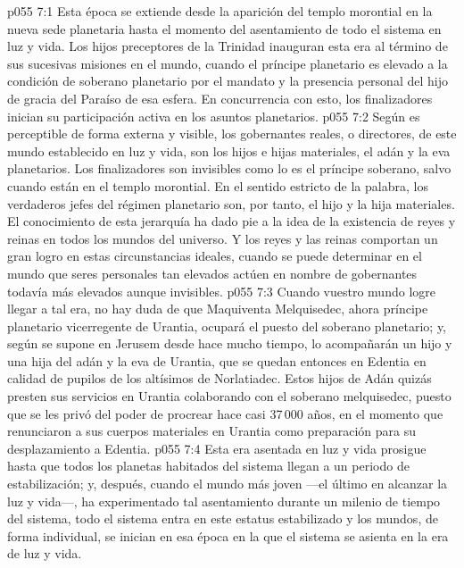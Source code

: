 \vs p055 7:1 Esta época se extiende desde la aparición del templo morontial en la nueva sede planetaria hasta el momento del asentamiento de todo el sistema en luz y vida. Los hijos preceptores de la Trinidad inauguran esta era al término de sus sucesivas misiones en el mundo, cuando el príncipe planetario es elevado a la condición de soberano planetario por el mandato y la presencia personal del hijo de gracia del Paraíso de esa esfera. En concurrencia con esto, los finalizadores inician su participación activa en los asuntos planetarios.
\vs p055 7:2 Según es perceptible de forma externa y visible, los gobernantes reales, o directores, de este mundo establecido en luz y vida, son los hijos e hijas materiales, el adán y la eva planetarios. Los finalizadores son invisibles como lo es el príncipe soberano, salvo cuando están en el templo morontial. En el sentido estricto de la palabra, los verdaderos jefes del régimen planetario son, por tanto, el hijo y la hija materiales. El conocimiento de esta jerarquía ha dado pie a la idea de la existencia de reyes y reinas en todos los mundos del universo. Y los reyes y las reinas comportan un gran logro en estas circunstancias ideales, cuando se puede determinar en el mundo que seres personales tan elevados actúen en nombre de gobernantes todavía más elevados aunque invisibles.
\vs p055 7:3 Cuando vuestro mundo logre llegar a tal era, no hay duda de que Maquiventa Melquisedec, ahora príncipe planetario vicerregente de Urantia, ocupará el puesto del soberano planetario; y, según se supone en Jerusem desde hace mucho tiempo, lo acompañarán un hijo y una hija del adán y la eva de Urantia, que se quedan entonces en Edentia en calidad de pupilos de los altísimos de Norlatiadec. Estos hijos de Adán quizás presten sus servicios en Urantia colaborando con el soberano melquisedec, puesto que se les privó del poder de procrear hace casi 37\,000 años, en el momento que renunciaron a sus cuerpos materiales en Urantia como preparación para su desplazamiento a Edentia.
\vs p055 7:4 \pc Esta era asentada en luz y vida prosigue hasta que todos los planetas habitados del sistema llegan a un periodo de estabilización; y, después, cuando el mundo más joven ---el último en alcanzar la luz y vida---, ha experimentado tal asentamiento durante un milenio de tiempo del sistema, todo el sistema entra en este estatus estabilizado y los mundos, de forma individual, se inician en esa época en la que el sistema se asienta en la era de luz y vida.
